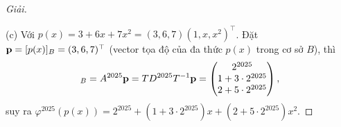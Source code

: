 \documentclass{article}
\begin{document}
\begin{proof}[Giải]
\begin{equation*}
	\end{equation*}
	\item(c) Với $p(x) = 3 + 6x + 7x^2 = (3,6,7)(1,x,x^2)^\top$. Đặt ${\bf p} = [p(x)]_B = (3,6,7)^\top$ (vector tọa độ của đa thức $p(x)$ trong cơ sở $B$), thì
	\begin{equation*}
		[\varphi^{2025}(p(x))]_B = A^{2025}{\bf p} = TD^{2025}T^{-1}{\bf p} = \begin{pmatrix}
			2^{2025}\\1 + 3\cdot2^{2025}\\2 + 5\cdot2^{2025}
		\end{pmatrix},
	\end{equation*}
	suy ra $\varphi^{2025}(p(x)) = 2^{2025} + (1 + 3\cdot2^{2025})x + (2 + 5\cdot2^{2025})x^2$.
\end{proof}
\end{document}
